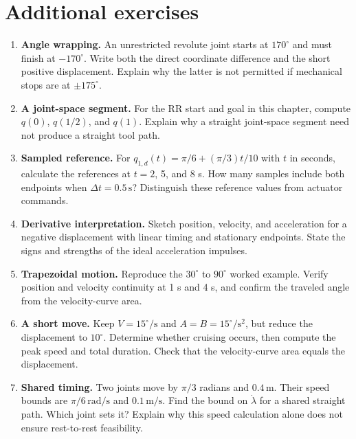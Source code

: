 \section{Additional exercises}
\begin{enumerate}
\item \textbf{Angle wrapping.} An unrestricted revolute joint starts at
$170^\circ$ and must finish at $-170^\circ$. Write both the direct
coordinate difference and the short positive displacement. Explain why
the latter is not permitted if mechanical stops are at $\pm175^\circ$.

\item \textbf{A joint-space segment.} For the RR start and goal in this
chapter, compute $q(0)$, $q(1/2)$, and $q(1)$. Explain why a straight
joint-space segment need not produce a straight tool path.

\item \textbf{Sampled reference.} For $q_{1,d}(t)=\pi/6+(\pi/3)t/10$
with $t$ in seconds, calculate the references at $t=2$, 5, and 8 s. How
many samples include both endpoints when $\Delta t=0.5\,\mathrm s$?
Distinguish these reference values from actuator commands.

\item \textbf{Derivative interpretation.} Sketch position, velocity,
and acceleration for a negative displacement with linear timing and
stationary endpoints. State the signs and strengths of the ideal
acceleration impulses.

\item \textbf{Trapezoidal motion.} Reproduce the $30^\circ$ to $90^\circ$
worked example. Verify position and velocity continuity at 1 s and 4 s,
and confirm the traveled angle from the velocity-curve area.

\item \textbf{A short move.} Keep $V=15^\circ/\mathrm s$ and
$A=B=15^\circ/\mathrm s^2$, but reduce the displacement to $10^\circ$.
Determine whether cruising occurs, then compute the peak speed and total
duration. Check that the velocity-curve area equals the displacement.

\item \textbf{Shared timing.} Two joints move by $\pi/3$ radians and
$0.4\,\mathrm m$. Their speed bounds are $\pi/6\,\mathrm{rad/s}$ and
$0.1\,\mathrm{m/s}$. Find the bound on $\dot\lambda$ for a shared
straight path. Which joint sets it? Explain why this speed calculation
alone does not ensure rest-to-rest feasibility.
\end{enumerate}

